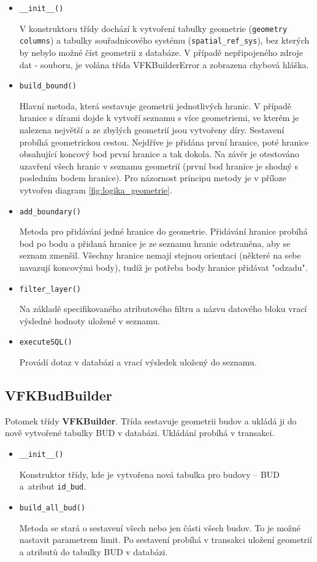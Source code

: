 \begin{itemize}[leftmargin=50pt]
\item \verb|__init__()|

V konstruktoru třídy dochází k vytvoření tabulky geometrie
(\verb|geometry columns|) a tabulky souřadnicového systému
(\verb|spatial_ref_sys|), bez kterých by nebylo možné číst geometrii z
databáze. V případě nepřipojeného zdroje dat -  souboru, je
volána třída VFKBuilderError a zobrazena chybová hláška.
\item \verb|build_bound()|

Hlavní metoda, která sestavuje geometrii jednotlivých hranic. V
případě hranice s dírami dojde k vytvoří seznamu s více geometriemi,
ve kterém je nalezena největší a ze zbylých geometrií jsou vytvořeny
díry. Sestavení probíhá geometrickou cestou. Nejdříve je přidána první
hranice, poté hranice obsahující koncový bod první hranice a tak
dokola. Na závěr je otestováno uzavření všech hranic v seznamu
geometrií (první bod hranice je shodný s posledním bodem hranice). Pro
názornost principu metody je v příloze vytvořen
diagram \ref{fig:logika_geometrie}.
\item \verb|add_boundary()|

Metoda pro přidávání jedné hranice do geometrie. Přidávání hranice
probíhá bod po bodu a přidaná hranice je ze seznamu hranic odstraněna,
aby se seznam zmenšil. Všechny hranice nemají stejnou
orientaci (některé na sebe navazují koncovými body), tudíž je potřeba
body hranice přidávat "odzadu".
\item \verb|filter_layer()|

Na základě specifikovaného atributového filtru a názvu datového bloku
vrací výsledné hodnoty uložené v seznamu.
\item \verb|executeSQL()|

Provádí  dotaz v databázi a vrací výsledek uložený do seznamu.

\end{itemize}
\subsection{VFKBudBuilder}
Potomek třídy \textbf{VFKBuilder}. Třída sestavuje geometrii budov a
ukládá ji do nově vytvořené tabulky BUD v databázi. Ukládání probíhá v
transakci.
\begin{itemize}[leftmargin=50pt]
\item \verb|__init__()|

Konstruktor třídy, kde je vytvořena nová tabulka pro budovy -- BUD a~atribut \verb|id_bud|.
\item \verb|build_all_bud()|

Metoda se stará o sestavení všech nebo jen části všech budov. To je
možné nastavit parametrem limit. Po sestavení probíhá v transakci
uložení geo\-metrií a atributů do tabulky BUD v databázi.
\end{itemize}
